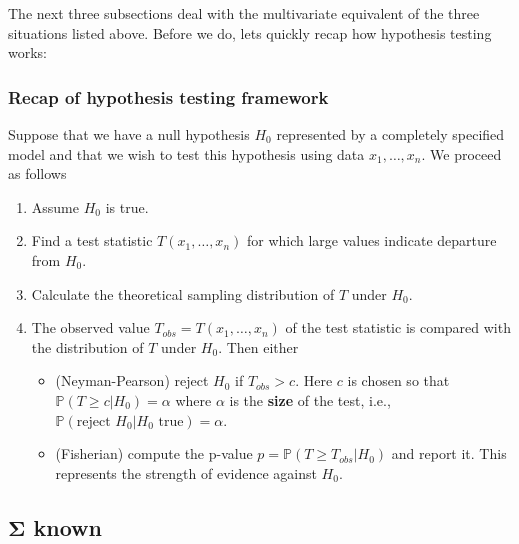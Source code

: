\documentclass[
]{book}
\providecommand{\tightlist}{%
  \setlength{\itemsep}{0pt}\setlength{\parskip}{0pt}}
\theoremstyle{definition}
\theoremstyle{definition}
\theoremstyle{definition}
\theoremstyle{definition}
\theoremstyle{remark}
\begin{document}
The next three subsections deal with the multivariate equivalent of the three situations listed above. Before we do, lets quickly recap how hypothesis testing works:

\hypertarget{recap-of-hypothesis-testing-framework}{%
\subsubsection*{Recap of hypothesis testing framework}\label{recap-of-hypothesis-testing-framework}}

Suppose that we have a null hypothesis \(H_0\) represented by a completely specified model and that we wish to test this hypothesis using data \(x_1, \ldots, x_n\). We proceed as follows

\begin{enumerate}
\def\labelenumi{\arabic{enumi}.}
\item
  Assume \(H_0\) is true.
\item
  Find a test statistic \(T(x_1, \ldots, x_n)\) for which large values indicate departure from \(H_0\).
\item
  Calculate the theoretical sampling distribution of \(T\) under \(H_0\).
\item
  The observed value \(T_{obs}=T(x_1, \ldots, x_n)\) of the test statistic is compared with the distribution of \(T\) under \(H_0\). Then either

  \begin{itemize}
  \tightlist
  \item
    (Neyman-Pearson) reject \(H_0\) if \(T_{obs}>c\). Here \(c\) is chosen so that \(\mathbb{P}(T\geq c| H_0)=\alpha\) where \(\alpha\) is the \textbf{size} of the test, i.e., \(\mathbb{P}(\mbox{reject } H_0 | H_0 \mbox{ true})=\alpha\).
  \item
    (Fisherian) compute the p-value \(p=\mathbb{P}(T\geq T_{obs}|H_0)\) and report it. This represents the strength of evidence against \(H_0\).
  \end{itemize}
\end{enumerate}

\hypertarget{onesampleSigma}{%
\subsection{\texorpdfstring{\(\boldsymbol{\Sigma}\) known}{\textbackslash boldsymbol\{\textbackslash Sigma\} known}}\label{onesampleSigma}}
\end{document}
